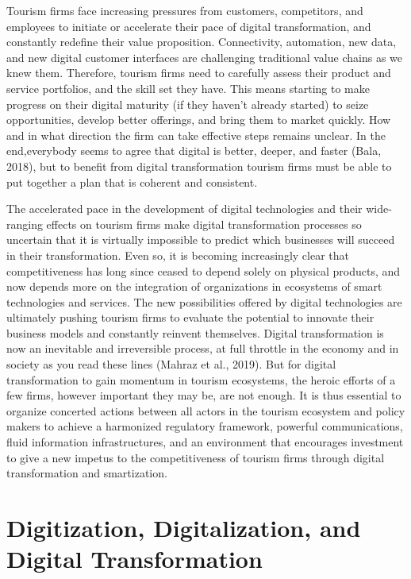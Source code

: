 \documentclass[
  letterpaper,
  DIV=11,
  numbers=noendperiod]{scrreprt}
\begin{document}
Tourism firms face increasing pressures from customers, competitors, and
employees to initiate or accelerate their pace of digital
transformation, and constantly redefine their value proposition.
Connectivity, automation, new data, and new digital customer interfaces
are challenging traditional value chains as we knew them. Therefore,
tourism firms need to carefully assess their product and service
portfolios, and the skill set they have. This means starting to make
progress on their digital maturity (if they haven't already started) to
seize opportunities, develop better offerings, and bring them to market
quickly. How and in what direction the firm can take effective steps
remains unclear. In the end,everybody seems to agree that digital is
better, deeper, and faster (Bala, 2018), but to benefit from digital
transformation tourism firms must be able to put together a plan that is
coherent and consistent.

The accelerated pace in the development of digital technologies and
their wide-ranging effects on tourism firms make digital transformation
processes so uncertain that it is virtually impossible to predict which
businesses will succeed in their transformation. Even so, it is becoming
increasingly clear that competitiveness has long since ceased to depend
solely on physical products, and now depends more on the integration of
organizations in ecosystems of smart technologies and services. The new
possibilities offered by digital technologies are ultimately pushing
tourism firms to evaluate the potential to innovate their business
models and constantly reinvent themselves. Digital transformation is now
an inevitable and irreversible process, at full throttle in the economy
and in society as you read these lines (Mahraz et al., 2019). But for
digital transformation to gain momentum in tourism ecosystems, the
heroic efforts of a few firms, however important they may be, are not
enough. It is thus essential to organize concerted actions between all
actors in the tourism ecosystem and policy makers to achieve a
harmonized regulatory framework, powerful communications, fluid
information infrastructures, and an environment that encourages
investment to give a new impetus to the competitiveness of tourism firms
through digital transformation and smartization.

\hypertarget{digitization-digitalization-and-digital-transformation}{%
\section{Digitization, Digitalization, and Digital
Transformation}\label{digitization-digitalization-and-digital-transformation}}
\end{document}
